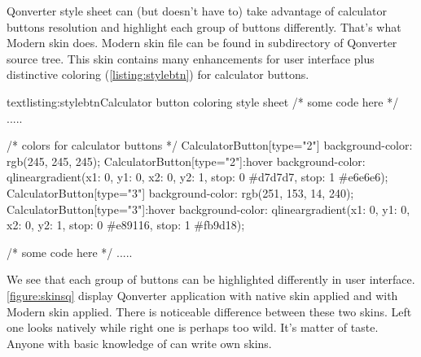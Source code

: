 Qonverter style sheet can (but doesn't have to) take advantage of calculator buttons resolution and highlight each group of buttons differently. That's what Modern skin does. Modern skin file can be found in subdirectory of Qonverter source tree. This skin contains many enhancements for user interface plus distinctive coloring (\autoref{listing:stylebtn}) for calculator buttons.
\begin{fdoccode}{text}{listing:stylebtn}{Calculator button coloring style sheet}
/* some code here */
.....

/* colors for calculator buttons */
CalculatorButton[type="2"] {
    background-color: rgb(245, 245, 245);
}
CalculatorButton[type="2"]:hover {
    background-color: qlineargradient(x1: 0, y1: 0, x2: 0, y2: 1, stop: 0 #d7d7d7, stop: 1 #e6e6e6);
}
CalculatorButton[type="3"] {
    background-color: rgb(251, 153, 14, 240);
}
CalculatorButton[type="3"]:hover {
    background-color: qlineargradient(x1: 0, y1: 0, x2: 0, y2: 1, stop: 0 #e89116, stop: 1 #fb9d18);
}

/* some code here */
.....
\end{fdoccode}

We see that each group of buttons can be highlighted differently in user interface. \autoref{figure:skinsq} display Qonverter application with native skin applied and with Modern skin applied. There is noticeable difference between these two skins. Left one looks natively while right one is perhaps too wild. It's matter of taste. Anyone with basic knowledge of  can write own skins.

